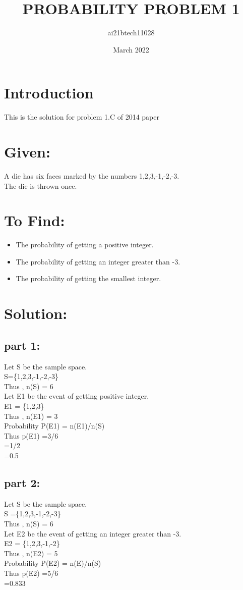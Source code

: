 \documentclass{article}
\title{PROBABILITY PROBLEM 1}
\author{ai21btech11028 }
\date{March 2022}
\begin{document}
\maketitle

\section{Introduction}
This is the solution for problem 1.C of 2014 paper
\section{Given:}
A die has six faces marked by the numbers 1,2,3,-1,-2,-3.\\
The die is thrown once.
\section{To Find:}
\begin{itemize}
    \item The probability of getting a positive integer.
    \item The probability of getting an integer greater than -3.
    \item The probability of getting the smallest integer.
\end{itemize}
\section{Solution: }
\subsection{part 1:}
Let S be the sample space.\\
S=\{1,2,3,-1,-2,-3\}\\
Thus  ,   n(S) = 6\\
Let E1 be the event of getting positive integer.\\
E1 = \{1,2,3\}\\
Thus  ,  n(E1) = 3\\
Probability   P(E1) = n(E1)/n(S)\\
Thus   p(E1) =3/6\\
             =1/2\\
             =0.5
\subsection{part 2:}
Let S be the sample space.\\
S =\{1,2,3,-1,-2,-3\}\\
Thus  ,   n(S) = 6\\
Let E2 be the event of getting an integer greater than -3.\\
E2 = \{1,2,3,-1,-2\}\\
Thus  ,  n(E2) = 5\\
Probability   P(E2) = n(E)/n(S)\\
Thus   p(E2) =5/6\\
             =0.833\\
\end{document}
